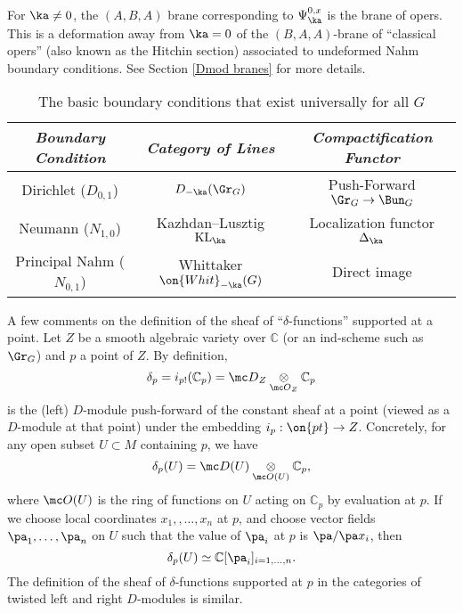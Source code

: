 \documentclass[11pt,reqno]{amsart}
\theoremstyle{plain}
\numberwithin{equation}{section}
\newcommand{\C}{\mathbb{C}}
\DeclareMathOperator{\KL}{KL}
\theoremstyle{definition}
\begin{document}
\begin{enumerate}
For $\ka \neq 0$, the $(A,B,A)$ brane corresponding to
$\Psi_\ka^{0,x}$ is the brane of opers. This is a deformation away
from $\ka=0$ of the $(B,A,A)$-brane of ``classical opers'' (also known
as the Hitchin section) associated to undeformed Nahm boundary
conditions. See Section \ref{Dmod branes} for more details.

\end{enumerate}

\bigskip

\begin{table}[h]
\begin{center}
\begin{tabular}{|c||c||c|}
\hline
{\em Boundary Condition} & {\em Category of Lines} & {\em
  Compactification Functor}  \\
\hline \hline
Dirichlet ($D_{0,1}$) & $D_{-\ka}(\Gr_G)$  & Push-Forward $\Gr_G \to \Bun_G$  \\
\hline
Neumann ($N_{1,0}$) & Kazhdan--Lusztig $\KL_\ka$ & Localization
functor $\Delta_\ka$ \\
\hline
Principal Nahm ($N_{0,1}$) & Whittaker $\on{Whit}_{-\ka}(G)$ & Direct image  \\
\hline
\end{tabular} 
\end{center}
\vspace*{5mm}
\caption{The basic boundary conditions that exist universally for all
  $G$}\label{tab:two}
\end{table}

A few comments on the definition of the sheaf of
``$\delta$-functions'' supported at a point. Let $Z$ be a smooth
algebraic variety over $\C$ (or an ind-scheme such as $\Gr_G$) and $p$
a point of $Z$. By definition,
$$
\delta_p = i_{p!}(\C_p) = {\mc D}_Z \underset{{\mc O}_Z}\otimes \C_p
$$
is the (left) $D$-module push-forward of the constant sheaf at a
point (viewed as a $D$-module at that point) under the embedding
$i_p: \on{pt} \to Z$. Concretely, for any open subset $U \subset M$
containing $p$, we have
$$
\delta_p(U) = {\mc D}(U) \underset{{\mc O}(U)}{\otimes} \C_p,
$$
where ${\mc O}(U)$ is the ring of functions on $U$ acting on $\C_p$ by
evaluation at $p$. If we choose local coordinates $x_1,,\ldots,x_n$ at
$p$, and choose vector fields $\pa_1,\ldots,\pa_n$ on $U$ such that
the value of $\pa_i$ at $p$ is $\pa/\pa x_i$, then
$$
\delta_p(U) \simeq \C[\pa_i]_{i=1,\ldots,n}.
$$
The definition of the sheaf of $\delta$-functions supported at $p$ in
the categories of twisted left and right $D$-modules is similar.
\end{document}
